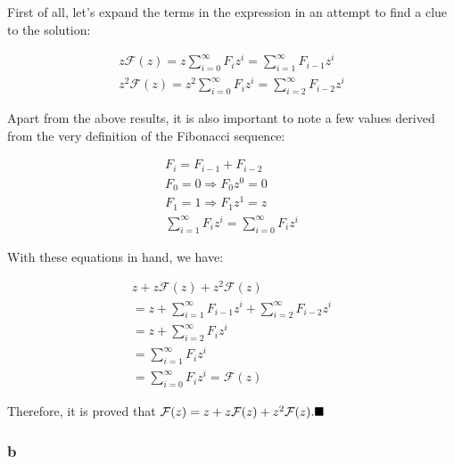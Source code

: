 \documentclass[8pt,a4paper]{article}
\begin{document}
  First of all, let's expand the terms in the expression in an attempt to
find a clue to the solution:

\begin{equation*}
  \begin{split}
    z\mathcal{F}(z) = z \sum\limits_{i = 0}^{\infty} F_{i}z^{i} = \sum\limits_{i = 1}^{\infty}F_{i - 1}z^{i} \\
    z^{2}\mathcal{F}(z) = z^{2} \sum\limits_{i = 0}^{\infty} F_{i}z^{i} = \sum\limits_{i = 2}^{\infty} F_{i - 2}z^{i}
  \end{split}
\end{equation*}

  Apart from the above results, it is also important to note a few values derived from the
very definition of the Fibonacci sequence:

\begin{equation*}
  \begin{split}
    F_{i} = F_{i - 1} + F_{i - 2} \\
    F_{0} = 0 \Rightarrow F_{0}z^{0} = 0 \\
    F_{1} = 1 \Rightarrow F_{1}z^{1} = z \\
    \sum\limits_{i = 1}^{\infty} F_{i}z^{i} = \sum\limits_{i = 0}^{\infty} F_{i}z^{i}
  \end{split}
\end{equation*}

  With these equations in hand, we have:

\begin{equation*}
  \begin{split}
    z + z\mathcal{F}(z) + z^{2}\mathcal{F}(z) \\
    = z + \sum\limits_{i = 1}^{\infty} F_{i - 1}z^{i} + \sum\limits_{i = 2}^{\infty} F_{i - 2}z^{i} \\
    = z + \sum\limits_{i = 2}^{\infty} F_{i}z^{i} \\
    = \sum\limits_{i = 1}^{\infty} F_{i}z^{i} \\
    = \sum\limits_{i = 0}^{\infty} F_{i}z^{i} = \mathcal{F}(z)
  \end{split}
\end{equation*}


  Therefore, it is proved that $\mathcal{F}(z) = z + z\mathcal{F}(z) + z^{2}\mathcal{F}(z).\qed$

\newpage

\subsubsection*{b}
\end{document}

